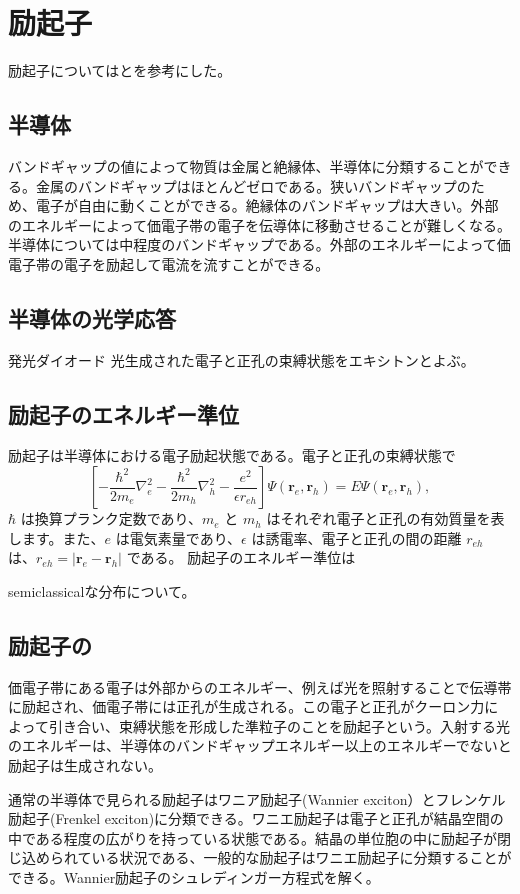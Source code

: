 \newpage
\section{励起子}
励起子については\cite{Yu2010}と\cite{Clau2012}を参考にした。
\subsection{半導体}
バンドギャップの値によって物質は金属と絶縁体、半導体に分類することができる。金属のバンドギャップはほとんどゼロである。狭いバンドギャップのため、電子が自由に動くことができる。絶縁体のバンドギャップは大きい。外部のエネルギーによって価電子帯の電子を伝導体に移動させることが難しくなる。半導体については中程度のバンドギャップである。外部のエネルギーによって価電子帯の電子を励起して電流を流すことができる。
\subsection{半導体の光学応答}
発光ダイオード
光生成された電子と正孔の束縛状態をエキシトンとよぶ。
\subsection{励起子のエネルギー準位}
励起子は半導体における電子励起状態である。電子と正孔の束縛状態で
\begin{equation}
    \left[ -\frac{\hbar^2}{2m_e} \nabla^2_e - \frac{\hbar^2}{2m_h} \nabla^2_h - \frac{e^2}{\epsilon r_{eh}} \right] \Psi(\mathbf{r}_e, \mathbf{r}_h) = E \Psi(\mathbf{r}_e, \mathbf{r}_h),
\end{equation}
$\hbar$ は換算プランク定数であり、$m_e$ と $m_h$ はそれぞれ電子と正孔の有効質量を表します。また、$e$ は電気素量であり、$\epsilon$ は誘電率、電子と正孔の間の距離 $r_{eh}$ は、$r_{eh} = |\mathbf{r}_e - \mathbf{r}_h|$ である。
励起子のエネルギー準位は

semiclassicalな分布について。
\subsection{励起子の}

価電子帯にある電子は外部からのエネルギー、例えば光を照射することで伝導帯に励起され、価電子帯には正孔が生成される。この電子と正孔がクーロン力によって引き合い、束縛状態を形成した準粒子のことを励起子という。入射する光のエネルギーは、半導体のバンドギャップエネルギー以上のエネルギーでないと励起子は生成されない。

通常の半導体で見られる励起子はワニア励起子(Wannier exciton）とフレンケル励起子(Frenkel exciton)に分類できる。ワニエ励起子は電子と正孔が結晶空間の中である程度の広がりを持っている状態である。結晶の単位胞の中に励起子が閉じ込められている状況である、一般的な励起子はワニエ励起子に分類することができる。Wannier励起子のシュレディンガー方程式を解く。

